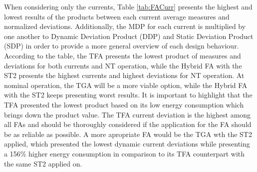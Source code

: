 \documentclass[pgmicro,diss,english]{iiufrgs}
\begin{document}
\begin{table}[]
\centering
\caption{Overall results considering the EDP and DPP for each metric and the product between those.}
\label{tab:edpddp}
\end{table}

When considering only the currents, Table \ref{tab:FACurr} presents the highest and lowest results of the products between each current average measures and normalized deviations. Additionally, the MDP for each current is multiplied by one another to Dynamic Deviation Product (DDP) and Static Deviation Product (SDP) in order to provide a more general overview of each design behaviour. According to the table, the TFA presents the lowest product of measures and deviations for both currents and NT operation, while the Hybrid FA with the ST2 presents the highest currents and highest deviations for NT operation. At nominal operation, the TGA will be a more viable option, while the Hybrid FA with the ST2 keeps presenting worst results. It is important to highlight that the TFA presented the lowest product based on its low energy consumption which brings down the product value. The TFA current deviation is the highest among all FAs and should be thoroughly considered if the application for the FA should be as reliable as possible. A more apropriate FA would be the TGA wth the ST2 applied, which presented the lowest dynamic current deviations while presenting a 156\% higher energy consumption in comparison to its TFA counterpart with the same ST2 applied on.
\end{document}
